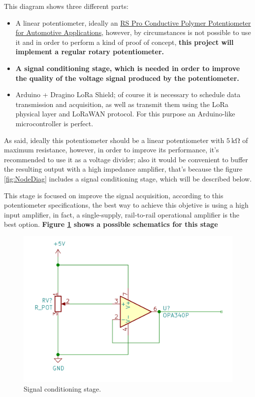 \documentclass[11pt,a4paper,dvipsnames,twoside]{article}
\newcounter{subsubsubsection}[subsubsection]
\newcommand{\doubt}[1] {\textbf{\color{Red3}#1}}
\begin{document}
This diagram shows three different parts:

\begin{itemize}
  \item A linear potentiometer, ideally an \href{https://docs.rs-online.com/37bf/0900766b814f0bd0.pdf}{RS Pro Conductive Polymer
  Potentiometer for Automotive Applications}, however, by circumstances is not possible to use it and in order to perform a kind of proof of concept, \doubt{this project will implement a regular rotary potentiometer.}
  \item \doubt{A signal conditioning stage, which is needed in order to improve the quality of the voltage signal produced by the potentiometer.}
  \item Arduino + Dragino LoRa Shield; of course it is necessary to schedule data transmission and acquisition, as well as transmit them using the LoRa physical layer and LoRaWAN protocol. For this purpose an Arduino-like microcontroller is perfect.
\end{itemize}

As said, ideally this potentiometer should be a linear potentiometer with $5\ \si{\kilo\ohm}$ of maximum resistance, however, in order to improve its performance, it's recommended to use it as a voltage divider; also it would be convenient to buffer the resulting output with a high impedance amplifier, that's because the figure \ref{fig:NodeDiag} includes a signal conditioning stage, which will be described below.

This stage is focused on improve the signal acquisition, according to this potentiometer specifications, the best way to achieve this objetive is using a high input amplifier, in fact, a single-supply, rail-to-rail operational amplifier is the best option. \doubt{Figure \ref{fig:SignalCond} shows a possible schematics for this stage}

\begin{figure}[htp]
  \centering
    \includegraphics[width=.9\textwidth]{../schemes/Signal_Conditioning.png}
  \caption{Signal conditioning stage.}
  \label{fig:SignalCond}
\end{figure}
\end{document}
